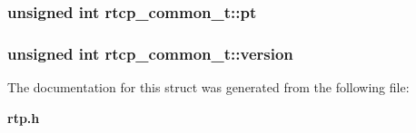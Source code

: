 \subsubsection{\setlength{\rightskip}{0pt plus 5cm}unsigned int {\bf rtcp\_\-common\_\-t::pt}}\label{structrtcp__common__t_o3}


\subsubsection{\setlength{\rightskip}{0pt plus 5cm}unsigned int {\bf rtcp\_\-common\_\-t::version}}\label{structrtcp__common__t_o0}




The documentation for this struct was generated from the following file:\begin{CompactItemize}
\item 
{\bf rtp.h}\end{CompactItemize}
